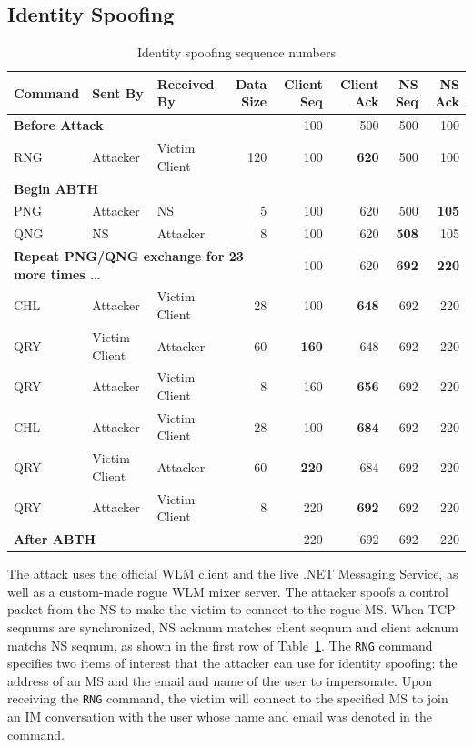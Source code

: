 \documentclass{sig-alternate}
\begin{document}
\subsection{Identity Spoofing}

\begin{table}[tbp]
	\centering

	\caption{Identity spoofing sequence numbers}
	\label{tab:identityspoof}

	\begin{tabular}{l l l r r r r r}
		\hline
		\hline
		\textbf{Command} & \textbf{Sent By} & \textbf{Received By} & \textbf{Data Size} & \textbf{Client Seq} & \textbf{Client Ack} & \textbf{NS Seq} & \textbf{NS Ack} \\
		\hline
		\multicolumn{4}{l}{\textbf{Before Attack}} & 100 & 500 & 500 & 100 \\
		RNG & Attacker & Victim Client & 120 & 100 & \textbf{620} & 500 & 100 \\
		\multicolumn{8}{l}{\textbf{Begin ABTH}} \\
		PNG & Attacker & NS & 5 & 100 & 620 & 500 & \textbf{105} \\
		QNG & NS & Attacker & 8 & 100 & 620 & \textbf{508} & 105 \\
		\multicolumn{4}{l}{\textbf{Repeat PNG/QNG exchange for 23 more times \dots}} & 100 & 620 & \textbf{692} & \textbf{220} \\
		CHL & Attacker & Victim Client & 28 & 100 & \textbf{648} & 692 & 220 \\
		QRY & Victim Client & Attacker & 60 & \textbf{160} & 648 & 692 & 220 \\
		QRY & Attacker & Victim Client & 8 & 160 & \textbf{656} & 692 & 220 \\
		CHL & Attacker & Victim Client & 28 & 100 & \textbf{684} & 692 & 220 \\
		QRY & Victim Client & Attacker & 60 & \textbf{220} & 684 & 692 & 220 \\
		QRY & Attacker & Victim Client & 8 & 220 & \textbf{692} & 692 & 220 \\
		\hline
		\hline
		\multicolumn{4}{l}{\textbf{After ABTH}} & 220 & 692 & 692 & 220 \\
	\end{tabular}
\end{table}

The attack uses the official WLM client and the live .NET Messaging Service, as well as a custom-made rogue WLM mixer server. 
The attacker spoofs a control packet from the NS to make the victim to connect to the rogue MS.
When TCP seqnums are synchronized, NS acknum matches client seqnum and client acknum matchs NS seqnum, as shown in the first row of Table~\ref{tab:identityspoof}.
The \texttt{RNG} command specifies two items of interest that the attacker can use for identity spoofing: the address of an MS and the email and name of the user to impersonate.
Upon receiving the \texttt{RNG} command, the victim will connect to the specified MS to join an IM conversation with the user whose name and email was denoted in the command.
\end{document}
